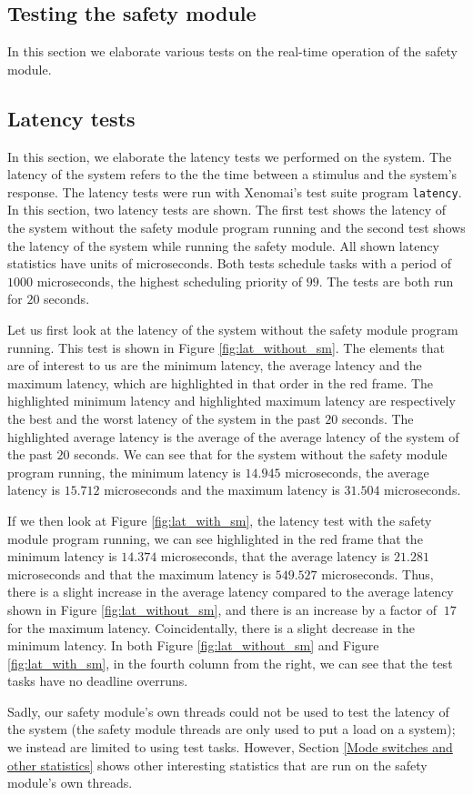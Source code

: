 \documentclass[12pt]{scrreprt}
\begin{document}
\subsection{Testing the safety module}
\label{Testing the safety module}
In this section we elaborate various tests on the real-time operation of the safety module.

\subsection{Latency tests}
\label{Latency tests}

In this section, we elaborate the latency tests we performed on the system. The latency of the system refers to the the time between a stimulus and the system's response. The latency tests were run with Xenomai's test suite program \texttt{latency}. In this section, two latency tests are shown. The first test shows the latency of the system without the safety module program running and the second test shows the latency of the system while running the safety module. All shown latency statistics have units of microseconds. Both tests schedule tasks with a period of $1000$ microseconds, the highest scheduling priority of $99$. The tests are both run for $20$ seconds. 
\par
Let us first look at the latency of the system without the safety module program running. This test is shown in Figure \ref{fig:lat_without_sm}. The elements that are of interest to us are the minimum latency, the average latency and the maximum latency, which are highlighted in that order in the red frame. The highlighted minimum latency and highlighted maximum latency are respectively the best and the worst latency of the system in the past $20$ seconds. The highlighted average latency is the average of the average latency of the system of the past $20$ seconds. We can see that for the system without the safety module program running, the minimum latency is $14.945$ microseconds, the average latency is $15.712$ microseconds and the maximum latency is $31.504$ microseconds. 
\par
If we then look at Figure \ref{fig:lat_with_sm}, the latency test with the safety module program running, we can see highlighted in the red frame that the minimum latency is $14.374$ microseconds, that the average latency is $21.281$ microseconds and that the maximum latency is $549.527$ microseconds. Thus, there is a slight increase in the average latency compared to the average latency shown in Figure \ref{fig:lat_without_sm}, and there is an increase by a factor of $~17$ for the maximum latency. Coincidentally, there is a slight decrease in the minimum latency. In both Figure \ref{fig:lat_without_sm} and Figure \ref{fig:lat_with_sm}, in the fourth column from the right, we can see that the test tasks have no deadline overruns.
\par
Sadly, our safety module's own threads could not be used to test the latency of the system (the safety module threads are only used to put a load on a system); we instead are limited to using test tasks. However, Section \ref{Mode switches and other statistics} shows other interesting statistics that are run on the safety module's own threads.
\end{document}
